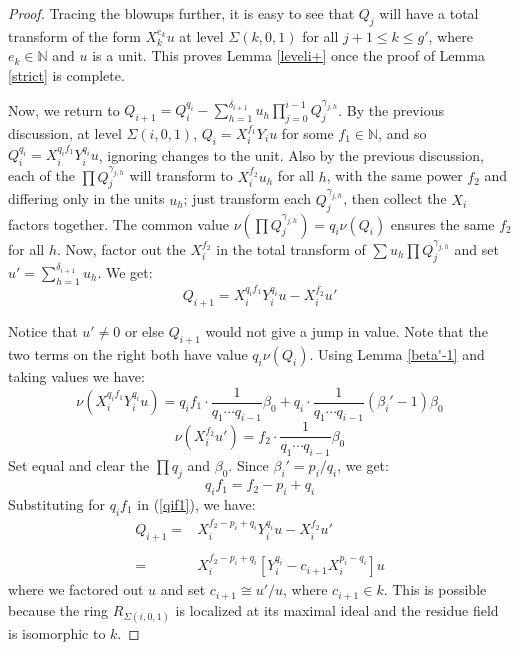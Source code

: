 \documentclass[10pt,a4paper]{amsart}
\begin{document}
\begin{proof}
Tracing the blowups further, it is easy to see that $Q_j$ will have a total transform of the form $\displaystyle X_{k}^{e_k}u$ at level $\Sigma(k,0,1)$ for all $j+1\leq k \leq g'$, where $e_k\in\mathbb{N}$ and $u$ is a unit. This proves Lemma \ref{leveli+} once the proof of Lemma \ref{strict} is complete.

Now, we return to $\displaystyle Q_{i+1}=Q_i^{q_i}-\sum_{h=1}^{\delta_{i+1}} u_h \prod_{j=0}^{i-1}Q_j^{\gamma_{j,h}}$. By the previous discussion, at level $\Sigma(i,0,1)$, $Q_i=X_{i}^{f_1}Y_{i}u$ for some $f_1\in\mathbb{N}$, and so $Q_i^{q_i}=X_i^{q_if_1}Y_i^{q_i}u$, ignoring changes to the unit. Also by the previous discussion, each of the $\prod Q_j^{\gamma_{j,h}}$ will transform to $X_{i}^{f_2}u_h$ for all $h$, with the same power $f_2$ and differing only in the units $u_h$; just transform each $Q_j^{\gamma_{j,h}}$, then collect the $X_{i}$ factors together. The common value $\nu(\prod Q_j^{\gamma_{j,h}})=q_i\nu(Q_i)$ ensures the same $f_2$ for all $h$. Now, factor out the $X_{i}^{f_2}$ in the total transform of $\sum u_h \prod Q_j^{\gamma_{j,h}}$ and set $u'=\sum_{h=1}^{\delta_{i+1}} u_h$. We get:
\begin{equation} \label{qif1}
Q_{i+1}= X_{i}^{q_if_1}Y_{i}^{q_i}u - X_{i}^{f_2}u'
\end{equation}

Notice that $u'\neq 0$ or else $Q_{i+1}$ would not give a jump in value. Note that the two terms on the right both have value $q_i \nu(Q_i)$. Using Lemma \ref{beta'-1} and taking values we have:
\begin{equation*}
\nu\left(X_{i}^{q_if_1}Y_{i}^{q_i}u\right)=q_if_1 \cdot \frac{1}{q_1\cdots q_{i-1}}\beta_0 + q_i\cdot \frac{1}{q_1\cdots q_{i-1}}(\beta_i'-1)\beta_0
\end{equation*}
\begin{equation*}
\nu(X_i^{f_2}u')=f_2\cdot \frac{1}{q_1 \cdots q_{i-1}}\beta_0
\end{equation*}
Set equal and clear the $\prod q_j$ and $\beta_0$. Since $\beta_i'=p_i/q_i$, we get:
\begin{equation*}
q_i f_1=f_2-p_i+q_i
\end{equation*}
Substituting for $q_if_1$ in (\ref{qif1}), we have:
\begin{equation*}
\begin{array}{rl}
\displaystyle Q_{i+1}= & X_{i}^{f_2-p_i+q_i}Y_{i}^{q_i}u - X_{i}^{f_2}u'
\\\\
= & X_{i}^{f_2-p_i+q_i}\left[Y_{i}^{q_i} - c_{i+1}X_{i}^{p_i-q_i}\right]u
\end{array}
\end{equation*}
where we factored out $u$ and set $c_{i+1}\cong u'/u$, where $c_{i+1}\in k$. This is possible because the ring $R_{\Sigma(i,0,1)}$ is localized at its maximal ideal and the residue field is isomorphic to $k$.


\end{proof}
\end{document}
